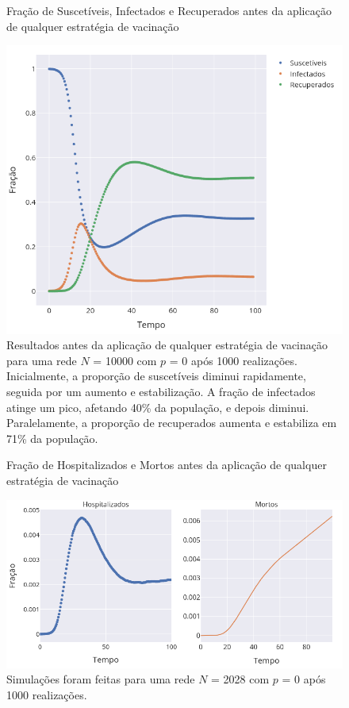 \begin{figure}[H]
    \centering
    \captionsetup{font=normalsize,skip=0.8pt,singlelinecheck=on,labelsep=endash}
    \caption{Fração de Suscetíveis, Infectados e Recuperados antes da aplicação de qualquer estratégia de vacinação}
    \includegraphics[scale= 0.5]{figuras/pre_vacina_nponderado.png}
    \captionsetup{font=small,justification=justified}
    \caption*{Resultados antes da aplicação de qualquer 
    estratégia de vacinação para uma rede $N$ = 10000 com $p $ = 0 após 1000 realizações. Inicialmente, a proporção de suscetíveis diminui rapidamente, seguida por um aumento e estabilização. A fração de infectados atinge um pico, afetando 
    40\% da população, e depois diminui. Paralelamente, a proporção de recuperados aumenta e estabiliza em 71\% da população.}
    \label{fig:pre_vacina}
\end{figure}

\begin{figure}[H]
    \centering
    \captionsetup{font=normalsize,skip=0.8pt,singlelinecheck=on,labelsep=endash}
    \caption{Fração de Hospitalizados e Mortos antes da aplicação de qualquer estratégia de vacinação}
    \includegraphics[scale= 0.5]{figuras/pre_vacina_mortos_nponderado.png}
    \captionsetup{font=small,justification=justified}
    \caption*{Simulações foram feitas para uma rede $N$ = 2028 com $p $ = 0 após 1000 realizações.}
    \label{fig:pre_vacina_mortos}
\end{figure}

